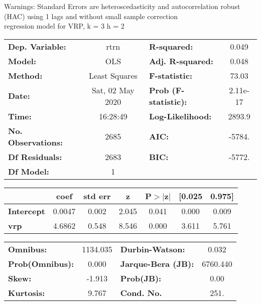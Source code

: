 Warnings: \newline
 [1] Standard Errors are heteroscedasticity and autocorrelation robust (HAC) using 1 lags and without small sample correction\\ 

regression model for VRP, k = 3 h = 2\begin{center}
\begin{tabular}{lclc}
\toprule
\textbf{Dep. Variable:}    &       rtrn       & \textbf{  R-squared:         } &     0.049   \\
\textbf{Model:}            &       OLS        & \textbf{  Adj. R-squared:    } &     0.048   \\
\textbf{Method:}           &  Least Squares   & \textbf{  F-statistic:       } &     73.03   \\
\textbf{Date:}             & Sat, 02 May 2020 & \textbf{  Prob (F-statistic):} &  2.11e-17   \\
\textbf{Time:}             &     16:28:49     & \textbf{  Log-Likelihood:    } &    2893.9   \\
\textbf{No. Observations:} &        2685      & \textbf{  AIC:               } &    -5784.   \\
\textbf{Df Residuals:}     &        2683      & \textbf{  BIC:               } &    -5772.   \\
\textbf{Df Model:}         &           1      & \textbf{                     } &             \\
\bottomrule
\end{tabular}
\begin{tabular}{lcccccc}
                   & \textbf{coef} & \textbf{std err} & \textbf{z} & \textbf{P$> |$z$|$} & \textbf{[0.025} & \textbf{0.975]}  \\
\midrule
\textbf{Intercept} &       0.0047  &        0.002     &     2.045  &         0.041        &        0.000    &        0.009     \\
\textbf{vrp}       &       4.6862  &        0.548     &     8.546  &         0.000        &        3.611    &        5.761     \\
\bottomrule
\end{tabular}
\begin{tabular}{lclc}
\textbf{Omnibus:}       & 1134.035 & \textbf{  Durbin-Watson:     } &    0.032  \\
\textbf{Prob(Omnibus):} &   0.000  & \textbf{  Jarque-Bera (JB):  } & 6760.440  \\
\textbf{Skew:}          &  -1.913  & \textbf{  Prob(JB):          } &     0.00  \\
\textbf{Kurtosis:}      &   9.767  & \textbf{  Cond. No.          } &     251.  \\
\bottomrule
\end{tabular}
\end{center}

